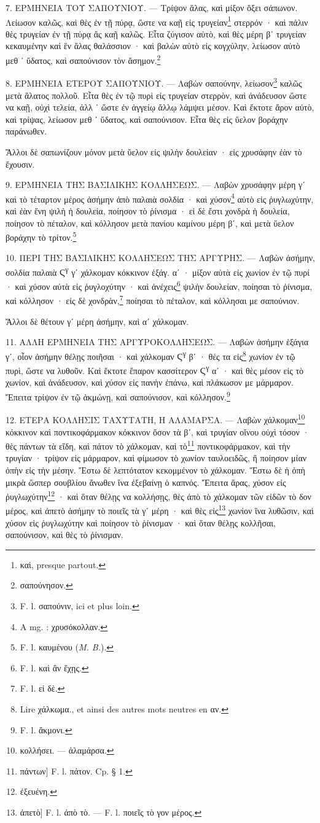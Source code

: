 \documentclass[a4paper, 11pt, oneside, polutonikogreek, french]{article}
\begin{document}
7. ΕΡΜΗΝΕΙΑ ΤΟΥ ΣΑΠΟΥΝΙΟΥ. --- Τρίψον ἅλας, καὶ μίξον ὄξει σάπωνον. Λείωσον καλῶς, καὶ θὲς ἐν τῇ πύρᾳ, ὥστε να καῇ εἰς τρυγείαν\footnote{καὶ, presque partout.} στερρόν · καὶ πάλιν θὲς τρυγείαν ἐν τῇ πύρᾳ ἂς καῇ καλῶς. Εἶτα ζύγισον αὐτὸ, καὶ θὲς μέρη βʹ τρυγείαν κεκαυμένην καὶ ἓν ἅλας θαλάσσιον · καὶ βαλὼν αὐτὸ εἰς κογχύλην, λείωσον αὐτὸ μεθ ᾽ ὕδατος, καὶ σαπούνισον τὸν ἄσημον.\footnote{σαπούνησον.}

8. ΕΡΜΗΝΕΙΑ ΕΤΕΡΟΥ ΣΑΠΟΥΝΙΟΥ. --- Λαβὼν σαπούνην, λείωσον\footnote{F. l. σαπούνιν, ici et plus loin.} καλῶς μετὰ ἅλατος πολλοῦ. Εἶτα θὲς ἐν τῷ πυρὶ εἰς τρυγείαν στερρὸν, καὶ ἀνάδευσον ὥστε να καῇ, οὐχὶ τελεία, ἀλλ ᾽ ὥστε ἐν ἀγγείῳ ἄλλῳ λάμψει μέσον. Καὶ ἔκτοτε ἄρον αὐτὸ, καὶ τρίψας, λείωσον μεθ ᾽ ὕδατος, καὶ σαπούνισον. Εἶτα θὲς εἰς ὕελον βοράχην παράνωθεν.

Ἄλλοι δὲ σαπωνίζουν μόνον μετὰ ὕελον εἰς ψιλὴν δουλείαν · εἰς χρυσάφην ἐὰν τὸ ἔχουσιν.

9. ΕΡΜΗΝΕΙΑ ΤΗΣ ΒΑΣΙΛΙΚΗΣ ΚΟΛΛΗΣΕΩΣ. --- Λαβὼν χρυσάφην μέρη γʹ καὶ τὸ τέταρτον μέρος ἀσήμην ἀπὸ παλαιὰ σολδία · καὶ χύσον\footnote{A mg. : χρυσόκολλαν.} αὐτὸ εἰς ῥυγλωχύτην, καὶ ἐὰν ἔνη ψιλὴ ἡ δουλεία, ποίησον τὸ ῥίνισμα · εἰ δὲ ἔστι χονδρὰ ἡ δουλεία, ποίησον τὸ πέταλον, καὶ κόλλησον μετὰ πανίου καμίνου μέρη βʹ, καὶ μετὰ ὕελον βοράχην τὸ τρίτον.\footnote{F. l. καυμένου (\emph{M. B.}).}

10. ΠΕΡΙ ΤΗΣ ΒΑΣΙΛΙΚΗΣ ΚΟΛΛΗΣΕΩΣ ΤΗΣ ΑΡΓΥΡΗΣ. --- Λαβὼν ἀσήμην, σολδία παλαιὰ Ϛ\textsuperscript{γ} γʹ χάλκομαν κόκκινον ἑξάγ. αʹ · μίξον αὐτὰ εἰς χωνίον ἐν τῷ πυρί · καὶ χύσον αὐτὰ εἰς ῥυγλοχύτην · καὶ ἀνέχεις\footnote{F. l. καὶ ἂν ἔχῃς.} ψιλὴν δουλείαν, ποίησαι τὸ ῥίνισμα, καὶ κόλλησον · εἰς δὲ χονδρὰν,\footnote{F. l. εἰ δὲ.} ποίησαι τὸ πέταλον, καὶ κόλλησαι με σαπούνιον.

Ἄλλοι δὲ θέτουν γʹ μέρη ἀσήμην, καὶ αʹ χάλκομαν.

11. ΑΛΛΗ ΕΡΜΗΝΕΙΑ ΤΗΣ ΑΡΓΥΡΟΚΟΛΛΗΣΕΩΣ. --- Λαβὼν ἀσήμην ἑξάγια γʹ, οἷον ἀσήμην θέλῃς ποιῆσαι · καὶ χάλκομαν Ϛ\textsuperscript{γ} βʹ · θές τα εἰς\footnote{Lire χάλκωμα., et ainsi des autres mots neutres en αν.} χωνίον ἐν τῷ πυρὶ, ὥστε να λυθοῦν. Καὶ ἔκτοτε ἔπαρον κασσίτερον Ϛ\textsuperscript{γ} αʹ · καὶ θὲς μέσον εἰς τὸ χωνίον, καὶ ἀνάδευσον, καὶ χύσον εἰς πανὴν ἐπάνω, καὶ πλάκωσον με μάρμαρον. Ἔπειτα τρίψον ἐν τῷ ἀκμώνῃ, καὶ σαπούνισον, καὶ κόλλησον.\footnote{F. l. ἄκμονι.}

12. ΕΤΕΡΑ ΚΟΛΛΗΣΙΣ ΤΑΧΥΤΑΤΗ, Η ΑΛΑΜΑΡΣΑ. --- Λαβὼν χάλκομαν\footnote{κολλήσει. --- ἀλαμάρσα.} κόκκινον καὶ ποντικοφάρμακον κόκκινον ὅσον τὰ βʹ, καὶ τρυγίαν οἴνου οὐχὶ τόσον · θὲς πάντων τὰ εἴδη, καὶ πάτον τὸ χάλκομαν, καὶ τὸ\footnote{πάντων] F. l. πάτον. Cp. § 1.} ποντικοφάρμακον, καὶ τὴν τρυγίαν · τρίψον εἰς μάρμαρον, καὶ φίμωσον τὸ χωνίον ταυλοειδῶς, ἢ ποίησον μίαν ὀπὴν εἰς τὴν μέσην. Ἔστω δὲ λεπτότατον κεκομμένον τὸ χάλκομαν. Ἔστω δὲ ἡ ὀπὴ μικρὰ ὥσπερ σουβλίου ἄνωθεν ἵνα ἐξεβαίνῃ ὁ καπνός. Ἔπειτα ἄρας, χύσον εἰς ῥυγλωχύτην\footnote{ἐξευένη.} · καὶ ὅταν θέλῃς να κολλήσῃς, θὲς ἀπὸ τὸ χάλκομαν τῶν εἰδῶν τὸ δον μέρος, καὶ ἀπετὸ ἀσήμην τὸ ποιεῖς τὰ γʹ μέρη · καὶ θὲς εἰς\footnote{ἀπετὸ] F. l. ἀπὸ τὸ. --- F. l. ποιεῖς τὸ γον μέρος.} χωνίον ἵνα λυθῶσιν, καὶ χύσον εἰς ῥυγλωχύτην καὶ ποίησον τὸ ῥίνισμαν · καὶ ὅταν θέλῃς κολλῆσαι, σαπούνισον, καὶ θὲς τὸ ῥίνισμαν.
\end{document}
